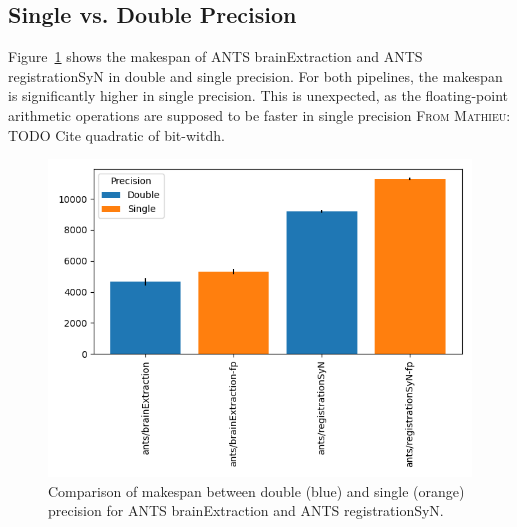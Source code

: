\documentclass[conference]{IEEEtran}
\newcommand{\MD}[1]{\color{magenta}\textsc{From Mathieu: }#1\color{black}}
\begin{document}
			
\subsection{Single vs. Double Precision}
Figure~\ref{fig:makespan-ants} shows the makespan of ANTS brainExtraction and ANTS registrationSyN in double and single precision. For both pipelines, the makespan is significantly higher in single precision. This is unexpected, as the floating-point arithmetic operations are supposed to be faster in single precision \MD{TODO Cite quadratic of bit-witdh}.
\begin{figure}[h]
	\includegraphics[width=\linewidth]{figures/makespan-ants.png}
	\caption{Comparison of makespan between double (blue) and single (orange) precision for ANTS brainExtraction and ANTS registrationSyN.}
	\label{fig:makespan-ants}
\end{figure}
\end{document}
